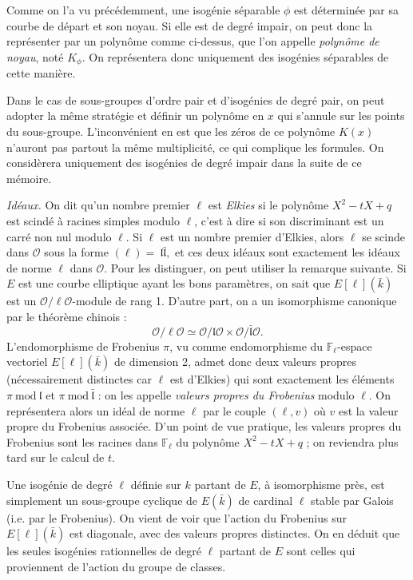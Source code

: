 \documentclass[11pt,a4paper]{article}
\newcommand{\F}{\mathbb{F}}
\renewcommand{\O}{\mathcal{O}}
\renewcommand{\frak}{\mathfrak}
\renewcommand{\mod}{\ \mathrm{mod}\ }
\renewcommand{\v}{\vspace{5mm}}
\theoremstyle{definition}
\begin{document}
Comme on l'a vu précédemment, une isogénie séparable $\phi$ est déterminée par sa courbe de départ et son noyau. Si elle est de degré impair, on peut donc la représenter par un polynôme comme ci-dessus, que l'on appelle \emph{polynôme de noyau}, noté $K_\phi$. On représentera donc uniquement des isogénies séparables de cette manière.

Dans le cas de sous-groupes d'ordre pair et d'isogénies de degré pair, on peut adopter la même stratégie et définir un polynôme en $x$ qui s'annule sur les points du sous-groupe. L'inconvénient en est que les zéros de ce polynôme $K(x)$ n'auront pas partout la même multiplicité, ce qui complique les formules. On considèrera uniquement des isogénies de degré impair dans la suite de ce mémoire. 
\v

\emph{Idéaux.} On dit qu'un nombre premier $\ell$ est \emph{Elkies} si le polynôme $X^2 - tX + q$ est scindé à racines simples modulo $\ell$, c'est à dire si son discriminant est un carré non nul modulo $\ell$. Si $\ell$ est un nombre premier d'Elkies, alors $\ell$ se scinde dans $\O$ sous la forme $(\ell) =~\frak l \bar{\frak l},$
et ces deux idéaux sont exactement les idéaux de norme $\ell$ dans $\O$. Pour les distinguer, on peut utiliser la remarque suivante. Si $E$ est une courbe elliptique ayant les bons paramètres, on sait que $E[\ell](\bar{k})$ est un $\O/\ell\O$-module de rang 1. D'autre part, on a un isomorphisme canonique par le théorème chinois :
$$\O/\ell\O \simeq \O/\frak l \O \times \O/\bar{\frak l} \O.$$
L'endomorphisme de Frobenius $\pi$, vu comme endomorphisme du $\F_\ell$-espace vectoriel $E[\ell](\bar{k})$ de dimension 2, admet donc deux valeurs propres (nécessairement distinctes car $\ell$ est d'Elkies) qui sont exactement les éléments $\pi\mod \frak l$ et $\pi\mod \bar{\frak l}$ : on les appelle \emph{valeurs propres du Frobenius} modulo $\ell$. On représentera alors un idéal de norme $\ell$ par le couple $(\ell, v)$ où $v$ est la valeur propre du Frobenius associée. D'un point de vue pratique, les valeurs propres du Frobenius sont les racines dans $\F_\ell$ du polynôme $X^2 - tX + q$ ; on reviendra plus tard sur le calcul de $t$.

Une isogénie de degré $\ell$ définie sur $k$ partant de $E$, à isomorphisme près, est simplement un sous-groupe cyclique de $E(\bar{k})$ de cardinal $\ell$ stable par Galois (i.e. par le Frobenius). On vient de voir que l'action du Frobenius sur $E[\ell](\bar{k})$ est diagonale, avec des valeurs propres distinctes. On en déduit que les seules isogénies rationnelles de degré $\ell$ partant de $E$ sont celles qui proviennent de l'action du groupe de classes.
\v
\end{document}
